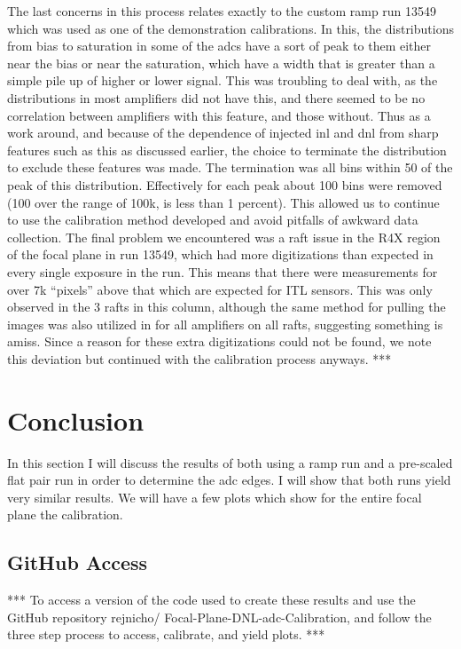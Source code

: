 \documentclass[11pt, letterpaper]{article}
\begin{document}
The last concerns in this process relates exactly to the custom ramp run 13549 which was used as one of the demonstration calibrations. In this, the distributions from bias to saturation in some of the adcs have a sort of peak to them either near the bias or near the saturation, which have a width that is greater than a simple pile up of higher or lower signal. This was troubling to deal with, as the distributions in most amplifiers did not have this, and there seemed to be no correlation between amplifiers with this feature, and those without. Thus as a work around, and because of the dependence of injected inl and dnl from sharp features such as this as discussed earlier, the choice to terminate the distribution to exclude these features was made. The termination was all bins within 50 of the peak of this distribution. Effectively for each peak about 100 bins were removed (100 over the range of 100k, is less than 1 percent). This allowed us to continue to use the calibration method developed and avoid pitfalls of awkward data collection. 
The final problem we encountered was a raft issue in the R4X region of the focal plane in run 13549, which had more digitizations than expected in every single exposure in the run. This means that there were measurements for over 7k “pixels” above that which are expected for ITL sensors. This was only observed in the 3 rafts in this column, although the same method for pulling the images was also utilized in for all amplifiers on all rafts, suggesting something is amiss. Since a reason for these extra digitizations could not be found, we note this deviation but continued with the calibration process anyways. 
*** 

\section{Conclusion}
In this section I will discuss the results of both using a ramp run and a pre-scaled flat pair run in order to determine the adc edges. I will show that both runs yield very similar results. We will have a few plots which show for the entire focal plane the calibration. 

\subsection{GitHub Access}
***
To access a version of the code used to create these results and use the GitHub repository rejnicho/
Focal-Plane-DNL-adc-Calibration, and follow the three step process to access, calibrate, and yield plots. 
***
\end{document}
